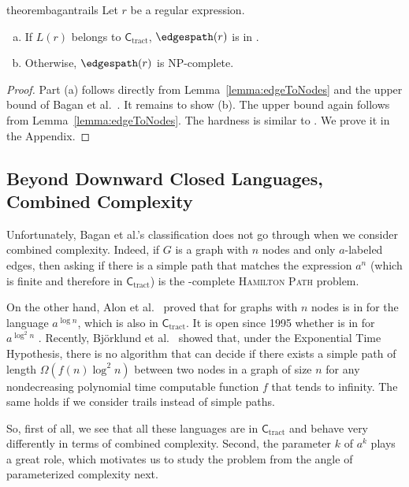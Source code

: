 \documentclass[a4paper,english]{lipics-v2016}
\newcommand{\ctract}{\ensuremath{\textsf{C}_\text{tract}}\xspace}
\theoremstyle{plain}
\begin{document}
\begin{restatable}{theorem}{bagantrails} \label{theo:baganForEdgeDisjoint}
	Let $r$ be a regular expression.
	\begin{enumerate}[(a)]
	\item If $L(r)$ belongs to \ctract, $\edgespath(r)$ is in \ptime.
	\item Otherwise, $\edgespath(r)$ is NP-complete.
	\end{enumerate}
\end{restatable}
\begin{proof}
Part (a) follows directly from Lemma~\ref{lemma:edgeToNodes} 
and the upper bound of Bagan et
al.~\cite[Theorem 2]{bagan}.
It remains to show (b). The upper bound again follows from
Lemma~\ref{lemma:edgeToNodes}. The hardness is similar to \cite[Lemma
2]{bagan}. We prove it in the Appendix.
\end{proof}

\subsection{Beyond Downward Closed Languages, Combined Complexity}

Unfortunately, Bagan et al.'s classification does not go through when
we consider combined complexity. Indeed, if $G$ is a graph with $n$
nodes and only $a$-labeled edges, then asking if there is a simple path that matches the
expression $a^n$ (which is finite and therefore in $\ctract$) is
the \np-complete \textsc{Hamilton Path} problem.

On the other hand, Alon et al.~\cite{AlonYZ-jacm95} proved that \nodespath for
graphs with $n$ nodes is in \ptime for the language $a^{\log n}$,
which is also in \ctract. It is open since 1995 whether \nodespath is in
\ptime for $a^{\log^2 n}$ \cite{AlonYZ-jacm95}. Recently, Bj\"orklund et
al.\ \cite{bjoerklund} showed that, under the Exponential Time
Hypothesis, there is no \ptime algorithm that can decide if there
exists a simple
path of length
$\Omega(f(n)\log^2 n)$ between two nodes in a graph of size $n$ for
any nondecreasing polynomial time computable function $f$ that tends
to infinity. The same holds if we consider trails instead of simple paths.
 
So, first of all, we see that all these languages are in \ctract and
behave very differently in terms of combined complexity. Second, the parameter $k$ of
$a^k$ plays a great role, which motivates us to study the
problem from
the angle of parameterized complexity next.
\end{document}
